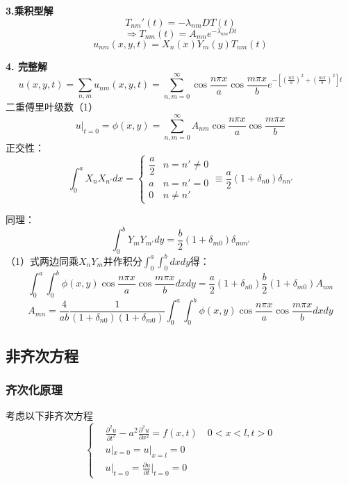 \begin{ex}[二维扩散问题]
\noindent\textbf{3.乘积型解}
        $$T_{nm}'(t)=-\lambda_{nm}DT(t)$$
        $$\Rightarrow T_{nm}(t)=A_{mn}e^{-\lambda_{nm}Dt}$$
        $$u_{nm}(x,y,t)=X_n(x)Y_m(y)T_{nm}(t)$$
        
\noindent\textbf{4. 完整解}
        $$u(x,y,t)=\sum_{n,m}u_{nm}(x,y,t)=\sum_{n,m=0}^\infty\cos{\frac{n\pi x}{a}}\cos{\frac{m\pi x}{b}}e^{-[\left(\frac{n\pi}{a}\right)^2+\left(\frac{m\pi}{b}\right)^2]t}$$
        二重傅里叶级数（1）
        $$u|_{t=0}=\phi(x,y)=\sum_{n,m=0}^{\infty}A_{nm}\cos{\frac{n\pi x}{a}}\cos{\frac{m\pi x}{b}}$$
        正交性：
    $$\int_0^a{X_nX_{n'}dx}=
    \begin{cases}
    \dfrac{a}{2}& n=n'\ne 0\\
    a&n=n'=0\\
    0& n\ne n'
    \end{cases}
    \equiv\frac{a}{2}(1+\delta_{n0})\delta_{nn'}$$

        同理：$$\int_0^bY_mY_{m'}dy=\frac{b}{2}(1+\delta_{m0})\delta_{mm'}$$
        （1）式两边同乘$X_nY_m$并作积分$\int_0^a\int_0^bdxdy$得：
        $$\int_0^a\int_0^b\phi(x,y)\cos{\frac{n\pi x}{a}}\cos{\frac{m\pi x}{b}}dxdy=\frac{a}{2}(1+\delta_{n0})\frac{b}{2}(1+\delta_{m0})A_{nm}$$
        $$A_{mn}=\frac{4}{ab}\frac{1}{(1+\delta_{n0})(1+\delta_{m0})}\int_0^a\int_0^b\phi(x,y)\cos{\frac{n\pi x}{a}}\cos{\frac{m\pi x}{b}}dxdy$$

\end{ex}

\subsection{非齐次方程}
\subsubsection{齐次化原理}
考虑以下非齐次方程
$$\left\{
\begin{aligned}
&
\frac{\partial^2{u}}{\partial{t}^2}-a^2\frac{\partial^2{u}}{\partial{x}^2}=f(x,t)\quad 0<x<l,t>0\\
&u|_{x=0}=u|_{x=l}=0\\
&u|_{t=0}=\frac{\partial{u}}{\partial t}\bigg|_{t=0}=0
        \end{aligned}
\right.$$

